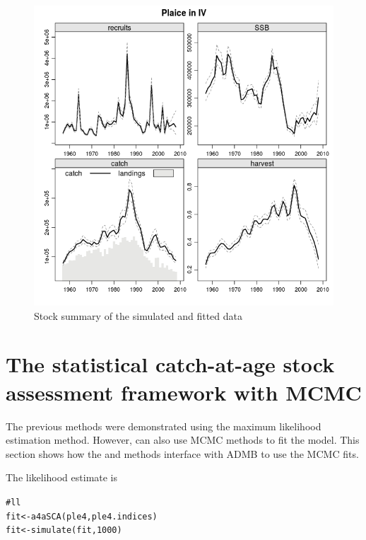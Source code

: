 \documentclass[a4paper,english,10pt]{article}\usepackage[]{graphicx}\usepackage[]{color}
\makeatletter
\newcommand{\hlnum}[1]{\textcolor[rgb]{0.063,0.58,0.627}{#1}}%
\newcommand{\hlcom}[1]{\textcolor[rgb]{0.588,0.588,0.588}{#1}}%
\newcommand{\hlstd}[1]{\textcolor[rgb]{0.196,0.196,0.196}{#1}}%
\newcommand{\hlkwb}[1]{\textcolor[rgb]{0.627,0,0.314}{#1}}%
\newcommand{\hlkwd}[1]{\textcolor[rgb]{0.78,0.227,0.412}{#1}}%
\newenvironment{kframe}{%
 \def\at@end@of@kframe{}%
 \ifinner\ifhmode%
  \def\at@end@of@kframe{\end{minipage}}%
  \begin{minipage}{\columnwidth}%
 \fi\fi%
 \def\FrameCommand##1{\hskip\@totalleftmargin \hskip-\fboxsep
 \colorbox{shadecolor}{##1}\hskip-\fboxsep
     \hskip-\linewidth \hskip-\@totalleftmargin \hskip\columnwidth}%
 \MakeFramed {\advance\hsize-\width
   \@totalleftmargin\z@ \linewidth\hsize
   \@setminipage}}%
 {\par\unskip\endMakeFramed%
 \at@end@of@kframe}
\newenvironment{knitrout}{}{} %
\makeatother
\begin{document}
\begin{knitrout}
\color{fgcolor}\begin{figure}[H]

{\centering \includegraphics[width=.9\linewidth]{figure/sim2-1} 

}

\caption[Stock summary of the simulated and fitted data]{Stock summary of the simulated and fitted data}\label{fig:sim2}
\end{figure}


\end{knitrout}

\section{The statistical catch-at-age stock assessment framework with MCMC}

The previous methods were demonstrated using the maximum likelihood estimation method. However,  can also use MCMC methods to fit the model. This section shows how the  and  methods interface with ADMB to use the MCMC fits.

The likelihood estimate is

\begin{knitrout}
\color{fgcolor}\begin{kframe}
\begin{alltt}
\hlcom{# ll}
\hlstd{fit} \hlkwb{<-} \hlkwd{a4aSCA}\hlstd{(ple4, ple4.indices)}
\hlstd{fit} \hlkwb{<-} \hlkwd{simulate}\hlstd{(fit,} \hlnum{1000}\hlstd{)}
\end{alltt}
\end{kframe}
\end{knitrout}
\end{document}
